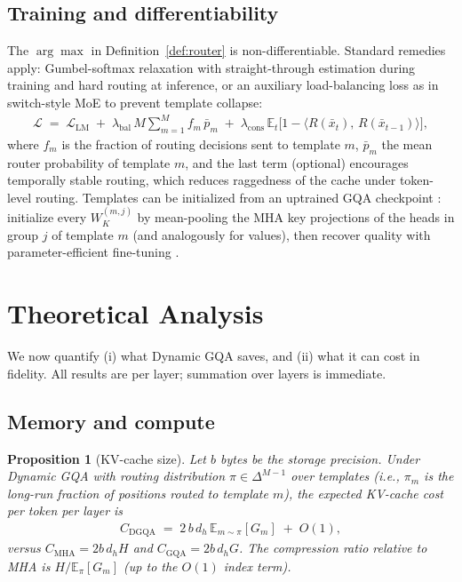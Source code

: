 \documentclass{article}
\newtheorem{proposition}[theorem]{Proposition}
\newcommand{\E}{\mathbb{E}}
\begin{document}
\subsection{Training and differentiability}
\label{sec:training}

The $\arg\max$ in Definition~\ref{def:router} is non-differentiable. Standard
remedies apply: Gumbel-softmax relaxation with straight-through estimation
\citep{jang2016categorical} during training and hard routing at inference,
or an auxiliary load-balancing loss as in switch-style MoE
\citep{fedus2022switch} to prevent template collapse:
\begin{align}
\mathcal{L} \;=\; \mathcal{L}_{\text{LM}}
\;+\; \lambda_{\text{bal}} \, M \sum_{m=1}^{M} f_m \, \bar{p}_m
\;+\; \lambda_{\text{cons}} \, \E_t \big[ 1 - \langle R(\bar x_t),\, R(\bar x_{t-1}) \rangle \big],
\label{eq:loss}
\end{align}
where $f_m$ is the fraction of routing decisions sent to template $m$,
$\bar{p}_m$ the mean router probability of template $m$, and the last term
(optional) encourages temporally stable routing, which reduces raggedness of
the cache under token-level routing. Templates can be initialized from an
uptrained GQA checkpoint \citep{ainslie2023gqa}: initialize every
$W_K^{(m,j)}$ by mean-pooling the MHA key projections of the heads in group
$j$ of template $m$ (and analogously for values), then recover quality with
parameter-efficient fine-tuning \citep{hu2022lora,dettmers2023qlora}.

\section{Theoretical Analysis}
\label{sec:theory}

We now quantify (i) what Dynamic GQA saves, and (ii) what it can cost in
fidelity. All results are per layer; summation over layers is immediate.

\subsection{Memory and compute}

\begin{proposition}[KV-cache size]
\label{prop:cache}
Let $b$ bytes be the storage precision. Under Dynamic GQA with routing
distribution $\pi \in \Delta^{M-1}$ over templates (i.e., $\pi_m$ is the
long-run fraction of positions routed to template $m$), the expected
KV-cache cost per token per layer is
\begin{align}
C_{\mathrm{DGQA}} \;=\; 2\, b\, d_h\, \E_{m \sim \pi}[G_m] \;+\; O(1),
\end{align}
versus $C_{\mathrm{MHA}} = 2 b\, d_h H$ and $C_{\mathrm{GQA}} = 2 b\, d_h G$.
The compression ratio relative to MHA is $H / \E_\pi[G_m]$ (up to the $O(1)$
index term).
\end{proposition}
\end{document}
